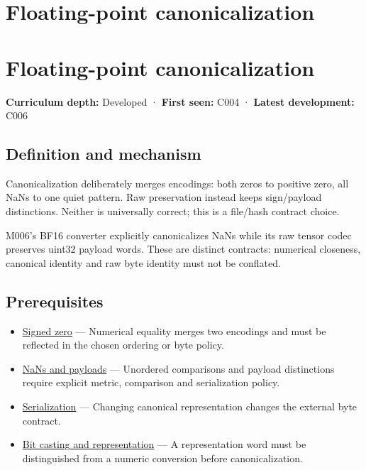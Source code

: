 \hypertarget{appendix-e90053a4b201}{}
\section*{Floating-point canonicalization}
\section{Floating-point canonicalization}\label{appendix-e90053a4b201-floating-point-canonicalization}

\textbf{Curriculum depth:} Developed · \textbf{First seen:} C004 · \textbf{Latest development:} C006

\subsection{Definition and mechanism}\label{appendix-e90053a4b201-definition-and-mechanism}

Canonicalization deliberately merges encodings: both zeros to positive zero, all NaNs to one quiet pattern. Raw preservation instead keeps sign/payload distinctions. Neither is universally correct; this is a file/hash contract choice.

M006's BF16 converter explicitly canonicalizes NaNs while its raw tensor codec preserves uint32 payload words. These are distinct contracts: numerical closeness, canonical identity and raw byte identity must not be conflated.

\subsection{Prerequisites}\label{appendix-e90053a4b201-prerequisites}

\begin{itemize}
\tightlist
\item
  \hyperref[appendix-3a048f032c1f]{Signed zero} --- Numerical equality merges two encodings and must be reflected in the chosen ordering or byte policy.
\item
  \hyperref[appendix-d6607cc4c235]{NaNs and payloads} --- Unordered comparisons and payload distinctions require explicit metric, comparison and serialization policy.
\item
  \hyperref[appendix-91d09ebed979]{Serialization} --- Changing canonical representation changes the external byte contract.
\item
  \hyperref[appendix-34ee45f161c1]{Bit casting and representation} --- A representation word must be distinguished from a numeric conversion before canonicalization.
\end{itemize}

